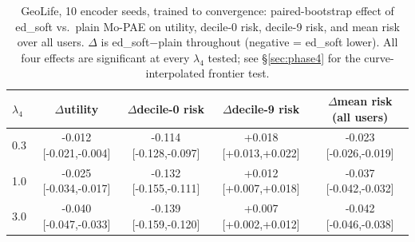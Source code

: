 \begin{table}[t]
\centering
\caption{GeoLife, 10 encoder seeds, trained to convergence: paired-bootstrap effect of ed\_soft vs.\ plain Mo-PAE on utility, decile-0 risk, decile-9 risk, and mean risk over all users. $\Delta$ is ed\_soft$-$plain throughout (negative = ed\_soft lower). All four effects are significant at every $\lambda_4$ tested; see \S\ref{sec:phase4} for the curve-interpolated frontier test.}
\label{tab:geolife-10seed-dominance}
\small
\begin{tabular}{@{}lcccc@{}}
\toprule
$\lambda_4$ & $\Delta$utility & $\Delta$decile-0 risk & $\Delta$decile-9 risk & $\Delta$mean risk (all users) \\
\midrule
0.3 & -0.012 [-0.021,-0.004] & -0.114 [-0.128,-0.097] & +0.018 [+0.013,+0.022] & -0.023 [-0.026,-0.019] \\
1.0 & -0.025 [-0.034,-0.017] & -0.132 [-0.155,-0.111] & +0.012 [+0.007,+0.018] & -0.037 [-0.042,-0.032] \\
3.0 & -0.040 [-0.047,-0.033] & -0.139 [-0.159,-0.120] & +0.007 [+0.002,+0.012] & -0.042 [-0.046,-0.038] \\
\bottomrule
\end{tabular}
\end{table}
